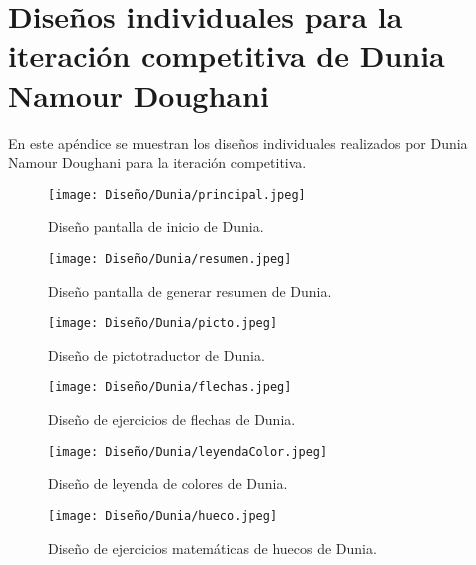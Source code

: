 \chapter{Diseños individuales para la iteración competitiva de Dunia Namour Doughani}
\label{ape:disenyoDunia}

  En este apéndice se muestran los diseños individuales realizados por Dunia Namour Doughani para la iteración competitiva.

  \begin{figure}[ht!]
    \centering
    \texttt{[image: Diseño/Dunia/principal.jpeg]}
    \caption{Diseño pantalla de inicio de Dunia.}
    \label{dunia1}
  \end{figure}

  \begin{figure}[ht!]
    \centering
    \texttt{[image: Diseño/Dunia/resumen.jpeg]}
    \caption{Diseño pantalla de generar resumen de Dunia.}
    \label{dunia2}
  \end{figure}

  \begin{figure}[ht!]
    \centering
    \texttt{[image: Diseño/Dunia/picto.jpeg]}
    \caption{Diseño de pictotraductor de Dunia.}
    \label{dunia3}
  \end{figure}

  \begin{figure}[ht!]
    \centering
    \texttt{[image: Diseño/Dunia/flechas.jpeg]}
    \caption{Diseño de ejercicios de flechas de Dunia.}
    \label{dunia4}
  \end{figure}

  \begin{figure}[ht!]
    \centering
    \texttt{[image: Diseño/Dunia/leyendaColor.jpeg]}
    \caption{Diseño de leyenda de colores de Dunia.}
    \label{dunia5}
  \end{figure}

  \begin{figure}[ht!]
    \centering
    \texttt{[image: Diseño/Dunia/hueco.jpeg]}
    \caption{Diseño de ejercicios matemáticas de huecos de Dunia.}
    \label{dunia6}
  \end{figure}